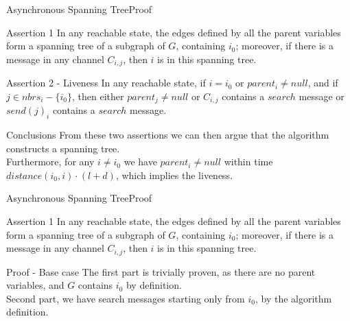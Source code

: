 \documentclass[pdf]{beamer}
\begin{document}
\begin{frame}[plain]{Asynchronous Spanning Tree}{Proof}
    \begin{block}{Assertion 1}
    In any reachable state, the edges defined by all the parent variables form a spanning tree
    of a subgraph of $G$, containing $i_0$; moreover, if there is a message in any channel $C_{i,j}$,
    then $i$ is in this spanning tree.
    \end{block}	
    \begin{block}{Assertion 2 - Liveness}
        In any reachable state, if $i=i_0$ or $parent_i \neq null$, and if $j \in nbrs_i - \{i_0\}$,
        then either $parent_j \neq null$ or $C_{i,j}$ contains a $search$ message or $send(j)_i$ contains a $search$ message.
    \end{block}	
    \begin{block}{Conclusions}
        From these two assertions we can then argue that the algorithm constructs a spanning tree.\\
        Furthermore, for any $i \neq i_0$ we have $parent_i \neq null$ within time $distance(i_0,i)\cdot(l+d)$, which implies the liveness.
    \end{block}
\end{frame}

\begin{frame}[plain]{Asynchronous Spanning Tree}{Proof}
    \begin{block}{Assertion 1}
    In any reachable state, the edges defined by all the parent variables form a spanning tree
    of a subgraph of $G$, containing $i_0$; moreover, if there is a message in any channel $C_{i,j}$,
    then $i$ is in this spanning tree.
    \end{block}	
    \pause
    \begin{block}{Proof - Base case}
    The first part is trivially proven,
    as there are no parent variables, and $G$ contains $i_0$ by definition.\\
    Second part, we have search messages starting only from $i_0$, by the algorithm definition.\\
    \end{block}
\end{frame}
\end{document}
